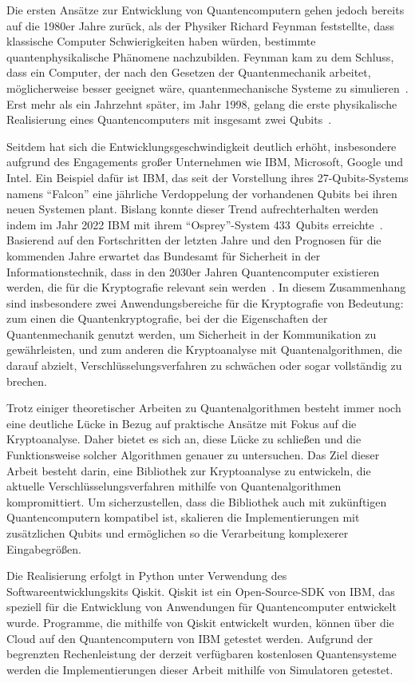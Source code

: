 \documentclass[lettersize,journal]{IEEEtran}
\begin{document}
Die ersten Ansätze zur Entwicklung von Quantencomputern gehen jedoch bereits auf die 1980er Jahre zurück,
als der Physiker Richard Feynman feststellte,
dass klassische Computer Schwierigkeiten haben würden,
bestimmte quantenphysikalische Phänomene nachzubilden.
Feynman kam zu dem Schluss, dass ein Computer,
der nach den Gesetzen der Quantenmechanik arbeitet,
möglicherweise besser geeignet wäre,
quantenmechanische Systeme zu simulieren~\cite{Feynman:1982}.
Erst mehr als ein Jahrzehnt später, im Jahr 1998,
gelang die erste physikalische Realisierung eines Quantencomputers
mit insgesamt zwei Qubits~\cite{Chuang:1998ExperimentalIO}.

Seitdem hat sich die Entwicklungsgeschwindigkeit deutlich erhöht,
insbesondere aufgrund des Engagements großer Unternehmen wie IBM, Microsoft, Google und Intel.
Ein Beispiel dafür ist IBM,
das seit der Vorstellung ihres 27-Qubits-Systems namens "`Falcon"'
eine jährliche Verdoppelung der vorhandenen Qubits bei ihren neuen Systemen plant.
Bislang konnte dieser Trend aufrechterhalten werden
indem im Jahr 2022 IBM mit ihrem "`Osprey"'-System 433~Qubits erreichte~\cite{IBM:2022}.
Basierend auf den Fortschritten der letzten Jahre und
den Prognosen für die kommenden Jahre erwartet
das Bundesamt für Sicherheit in der Informationstechnik,
dass in den 2030er Jahren Quantencomputer existieren werden,
die für die Kryptografie relevant sein werden~\cite{BSI:2023}.
In diesem Zusammenhang sind insbesondere zwei Anwendungsbereiche für die Kryptografie von Bedeutung:
zum einen die Quantenkryptografie, bei der die Eigenschaften der Quantenmechanik genutzt werden,
um Sicherheit in der Kommunikation zu gewährleisten, und
zum anderen die Kryptoanalyse mit Quantenalgorithmen, die darauf abzielt,
Verschlüsselungsverfahren zu schwächen oder sogar vollständig zu brechen.

Trotz einiger theoretischer Arbeiten zu Quantenalgorithmen
besteht immer noch eine deutliche Lücke in Bezug auf praktische Ansätze mit Fokus auf die Kryptoanalyse.
Daher bietet es sich an, diese Lücke zu schließen und die Funktionsweise solcher Algorithmen genauer zu untersuchen.
Das Ziel dieser Arbeit besteht darin, eine Bibliothek zur Kryptoanalyse zu entwickeln,
die aktuelle Verschlüsselungsverfahren mithilfe von Quantenalgorithmen kompromittiert.
Um sicherzustellen, dass die Bibliothek auch mit zukünftigen Quantencomputern kompatibel ist,
skalieren die Implementierungen mit zusätzlichen Qubits und
ermöglichen so die Verarbeitung komplexerer Eingabegrößen.

Die Realisierung erfolgt in Python unter Verwendung des Softwareentwicklungskits Qiskit.
Qiskit ist ein Open-Source-SDK von IBM,
das speziell für die Entwicklung von Anwendungen für Quantencomputer entwickelt wurde.
Programme, die mithilfe von Qiskit entwickelt wurden,
können über die Cloud auf den Quantencomputern von IBM getestet werden.
Aufgrund der begrenzten Rechenleistung der derzeit verfügbaren kostenlosen Quantensysteme
werden die Implementierungen dieser Arbeit mithilfe von Simulatoren getestet.
\end{document}
